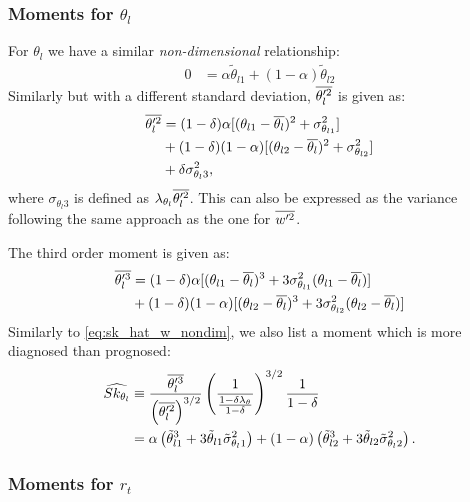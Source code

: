 \subsubsection{Moments for $\theta_l$}\label{subsubsec:lowerordermoments_thl}

For $\theta_l$ we have a similar \emph{non-dimensional} relationship:
\begin{align}
    \label{eq:thlp_bar_nondim}
    0 &= \alpha \tilde{\theta}_{l1} + (1 - \alpha) \tilde{\theta}_{l2}
\end{align}
Similarly but with a different standard deviation, $\overline{\theta_l'^2}$ is given as:
\begin{align}
    \label{eq:thlp2_bar}
    \overline{\theta_l'^2}
    &= (1 - \delta) \alpha [(\theta_{l1} - \overline{\theta_l})^2 + \sigma_{\theta_{l1}}^2] \nonumber\\
    &+ (1 - \delta) (1 - \alpha) [(\theta_{l2} - \overline{\theta_l})^2 + \sigma_{\theta_{l2}}^2] \nonumber\\
    &+ \delta \sigma_{\theta_l 3}^2,
\end{align}
where $\sigma_{\theta_l 3}$ is defined as $\lambda_{\theta_l} \overline{\theta_l'^2}$.
This can also be expressed as the variance following the same approach as the one for $\overline{w'^2}$.

The third order moment is given as:
\begin{align}
    \label{eq:theta_l_3_bar}
    \overline{\theta_l'^3}
    &= (1 - \delta) \alpha [(\theta_{l1} - \overline{\theta_l})^3
    + 3 \sigma_{\theta_{l1}}^2 (\theta_{l1} - \overline{\theta_l})] \nonumber\\
    &+ (1 - \delta) (1 - \alpha) [(\theta_{l2} - \overline{\theta_l})^3
    + 3 \sigma_{\theta_{l2}}^2 (\theta_{l2} - \overline{\theta_l})]
\end{align}
Similarly to \cref{eq:sk_hat_w_nondim}, we also list a moment which is more diagnosed than prognosed:
\begin{align}
    \widehat{Sk_{\theta_l}}
    &\equiv \frac{\overline{\theta_l'^3}}{\left( \overline{\theta_l'^2} \right)^{3/2}}\left(
    \frac{1}{\frac{1-\delta \lambda_\theta}{1-\delta}}
    \right)^{3/2}
    \frac{1}{1-\delta} \nonumber\\
    &= \alpha \left( \tilde{\theta}_{l1}^3 + 3 \tilde{\theta}_{l1} \tilde{\sigma}_{\theta_l 1}^2 \right)
    + (1 - \alpha) \left( \tilde{\theta}_{l2}^3 + 3 \tilde{\theta}_{l2} \tilde{\sigma}_{\theta_l 2}^2 \right).
    \label{eq:sk_hat_theta_l_nondim}
\end{align}

\subsubsection{Moments for $r_t$}\label{subsubsec:lowerordermoments_rt}

